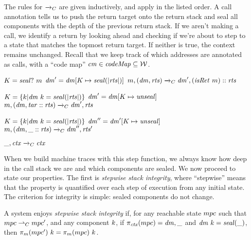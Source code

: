\documentclass[acmsmall,review,anonymous]{acmart}\settopmatter{printfolios=true,printccs=false,printacmref=false}
\begin{document}
The rules for \(\xrightarrow{}_C\) are given inductively, and apply in the listed order.
A call annotation tells us to push the return target onto the return stack and
seal all components with the depth of the previous return stack. If we aren't making a call,
we identify a return by looking ahead and checking if we're about to step to a state
that matches the topmost return target. If neither is true, the context remains unchanged.
%
Recall that we keep track of which addresses are
annotated as calls, with a ``code map'' $\mathit{cm} \in \mathit{codeMap} \subseteq
{\mathcal W}$.

\judgmentthree[ Call]
              {\(\codemap ~ (\mach ~ \PCname) = \callmap\)}
              {\(K = \mathit{seal?} ~ m\)}
              {\(\mathit{dm}' = \mathit{dm}[K \mapsto \mathit{seal(|\mathit{rts}|)}]\)}
                {\(m,(\mathit{dm},\mathit{rts}) \xrightarrow{}_C \mathit{dm}',(\mathit{isRet} ~ m)::\mathit{rts}\)}

\vspace*{-1ex}
              {\(K = \{k | \mathit{dm} ~ k = \mathit{seal(|\mathit{rts}|)}\}\)}
              {\(\mathit{dm}' = \mathit{dm}[K \mapsto \mathit{unseal}]\)}
              {\(m,(\mathit{dm},\mathit{tar}::\mathit{rts}) \xrightarrow{}_C \mathit{dm}',\mathit{rts}\)}

\vspace*{-1ex}
              {\(K = \{k | \mathit{dm} ~ k = \mathit{seal(|\mathit{rts}|)}\}\)}
              {\(\mathit{dm}'' = \mathit{dm}'[K \mapsto \mathit{unseal}]\)}
              {\(m,(\mathit{dm},\_::\mathit{rts}) \xrightarrow{}_C \mathit{dm}'',\mathit{rts}'\)}
              
\vspace*{-3.5ex}
\judgment[ Default]
         {}
         {\(\_,\mathit{ctx} \xrightarrow{}_C \mathit{ctx}\)}

When we build machine traces with this step function, we always know how deep in the
call stack we are and which components are sealed. We now proceed to state our properties.
The first is {\em stepwise stack integrity}, where ``stepwise'' means that the property is
quantified over each step of execution from any initial state. The criterion for integrity
is simple: sealed components do not change.

 A system enjoys {\em stepwise stack integrity} if, for any reachable state
\(mpc\) such that \(mpc \overset{}{\rightharpoonup}_C mpc'\),
and any component \(k\), if \(\pi_{\mathit{ctx}}(mpc) = \mathit{dm},\_\) and
\(\mathit{dm} ~ k = \mathit{seal(\_)}\), then \(\pi_m(mpc') ~ k =
\pi_m(mpc) ~ k\).
\end{document}
